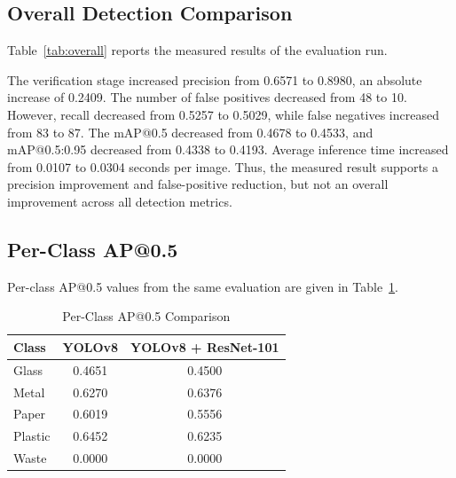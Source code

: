 \documentclass[conference]{IEEEtran}
\begin{document}
\subsection{Overall Detection Comparison}
Table~\ref{tab:overall} reports the measured results of the evaluation run.
\begin{table}[H]
\caption{Overall Metric Comparison on 110 Test Images (time in seconds per image)}
\label{tab:overall}
\centering
\footnotesize
\setlength{\tabcolsep}{2.5pt}
\end{table}

The verification stage increased precision from 0.6571 to 0.8980, an absolute increase of 0.2409. The number of false positives decreased from 48 to 10. However, recall decreased from 0.5257 to 0.5029, while false negatives increased from 83 to 87. The mAP@0.5 decreased from 0.4678 to 0.4533, and mAP@0.5:0.95 decreased from 0.4338 to 0.4193. Average inference time increased from 0.0107 to 0.0304 seconds per image. Thus, the measured result supports a precision improvement and false-positive reduction, but not an overall improvement across all detection metrics.

\subsection{Per-Class AP@0.5}
Per-class AP@0.5 values from the same evaluation are given in Table~\ref{tab:classap}.
\begin{table}[H]
\caption{Per-Class AP@0.5 Comparison}
\label{tab:classap}
\centering
\begin{tabular}{lcc}
\toprule
\textbf{Class} & \textbf{YOLOv8} & \textbf{YOLOv8 + ResNet-101}\\
\midrule
Glass & 0.4651 & 0.4500\\
Metal & 0.6270 & 0.6376\\
Paper & 0.6019 & 0.5556\\
Plastic & 0.6452 & 0.6235\\
Waste & 0.0000 & 0.0000\\
\bottomrule
\end{tabular}
\end{table}
\end{document}
